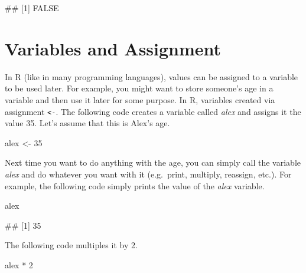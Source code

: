 \documentclass[
]{book}
\newenvironment{Shaded}{\begin{snugshade}}{\end{snugshade}}
\newcommand{\DecValTok}[1]{\textcolor[rgb]{0.00,0.00,0.81}{#1}}
\newcommand{\NormalTok}[1]{#1}
\newcommand{\OtherTok}[1]{\textcolor[rgb]{0.56,0.35,0.01}{#1}}
\newcommand{\SpecialCharTok}[1]{\textcolor[rgb]{0.00,0.00,0.00}{#1}}
\begin{document}
\begin{Shaded}
\begin{Highlighting}[]
\NormalTok{\#\# [1] FALSE}
\end{Highlighting}
\end{Shaded}

\hypertarget{variables-and-assignment}{%
\section{Variables and Assignment}\label{variables-and-assignment}}

In R (like in many programming languages), values can be assigned to a variable to be used later. For example, you might want to store someone's age in a variable and then use it later for some purpose. In R, variables created via assignment \texttt{\textless{}-}. The following code creates a variable called \emph{alex} and assigns it the value 35. Let's assume that this is Alex's age.

\begin{Shaded}
\begin{Highlighting}[]
\NormalTok{alex }\OtherTok{\textless{}{-}} \DecValTok{35}
\end{Highlighting}
\end{Shaded}

Next time you want to do anything with the age, you can simply call the variable \emph{alex} and do whatever you want with it (e.g.~print, multiply, reassign, etc.). For example, the following code simply prints the value of the \emph{alex} variable.

\begin{Shaded}
\begin{Highlighting}[]
\NormalTok{alex}
\end{Highlighting}
\end{Shaded}

\begin{Shaded}
\begin{Highlighting}[]
\NormalTok{\#\# [1] 35}
\end{Highlighting}
\end{Shaded}

The following code multiples it by 2.

\begin{Shaded}
\begin{Highlighting}[]
\NormalTok{alex }\SpecialCharTok{*} \DecValTok{2}
\end{Highlighting}
\end{Shaded}
\end{document}
